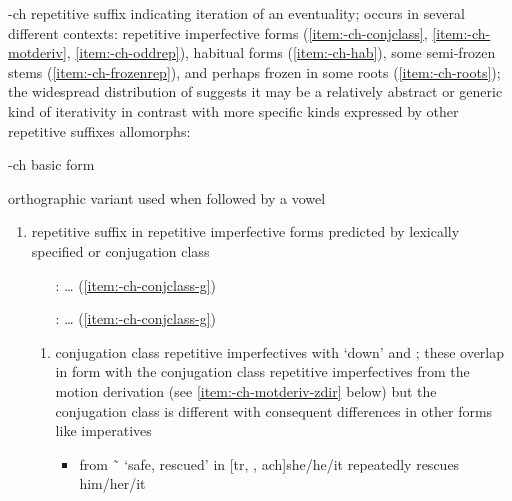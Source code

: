 \begin{morphdesc}[resume*=alphalist]
\item[-ch]\label{m:-ch}
	repetitive suffix indicating iteration of an eventuality;
	occurs in several different contexts:
		repetitive imperfective forms
		(\ref{item:-ch-conjclass}, \ref{item:-ch-motderiv}, \ref{item:-ch-oddrep}),
		habitual forms (\ref{item:-ch-hab}),
		some semi-frozen stems (\ref{item:-ch-frozenrep}),
		and perhaps frozen in some roots (\ref{item:-ch-roots});
	the widespread distribution of 	suggests it may be a
		relatively abstract or generic kind of iterativity
		in contrast with more specific kinds expressed by other
		repetitive suffixes
	\newline
	allomorphs:
	\begin{allolist}
	\item[-ch]	basic form
	\item[\X{-j}]	orthographic variant used when followed by a vowel
	\end{allolist}
	\begin{enumerate}
	\item	\label{item:-ch-conjclass}
		repetitive suffix in repetitive imperfective forms
		predicted by lexically specified  or  conjugation class
		\begin{itemize}
		\item[\fm{g̱}:]	… (\ref{item:-ch-conjclass-g̱})
		\item[\fm{g}:]	… (\ref{item:-ch-conjclass-g})
		\end{itemize}
		\begin{enumerate}
		\item	\label{item:-ch-conjclass-g̱}
			 conjugation class repetitive imperfectives
				with  ‘down’ and ;
			these overlap in form with the  conjugation class
				 repetitive imperfectives
				from the motion derivation
				(see \ref{item:-ch-motderiv-zdir} below)
				but the conjugation class is different with consequent differences
				in other forms like imperatives
			\begin{itemize}
			\item	{}
				from  \~\  ‘safe, rescued’ in
				\newline
				[tr, , ach]{she/he/it repeatedly rescues him/her/it}

\end{itemize}
\end{enumerate}
\end{enumerate}
\end{morphdesc}
